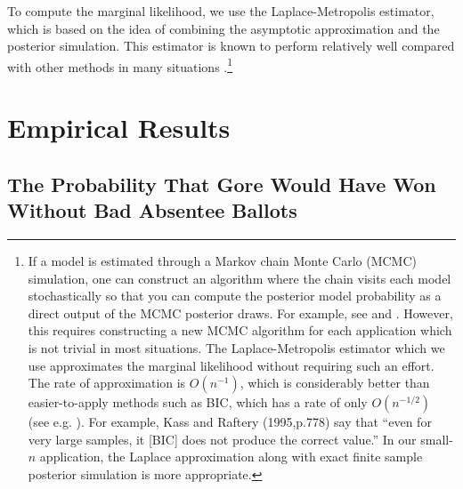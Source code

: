 \documentclass[11pt,titlepage]{article}
\renewcommand{\P}{\text{P}}
\begin{document}
To compute the marginal likelihood, we use the Laplace-Metropolis
estimator, which is based on the idea of combining the asymptotic
approximation and the posterior simulation. This estimator is known to
perform relatively well compared with other methods in many situations
\citep{raft:96,lewi:raft:97,dici:kass:raft:wass:97}.\footnote{If a
  model is estimated through a Markov chain Monte Carlo (MCMC)
  simulation, one can construct an algorithm where the chain visits
  each model stochastically so that you can compute the posterior
  model probability as a direct output of the MCMC posterior draws.
  For example, see \citet{carl:chib:95} and \citet{geor:mccu:93}.
  However, this requires constructing a new MCMC algorithm for each
  application which is not trivial in most situations.  The
  Laplace-Metropolis estimator which we use approximates the marginal
  likelihood without requiring such an effort.  The rate of
  approximation is $O(n^{-1})$, which is considerably better than
  easier-to-apply methods such as BIC, which has a rate of only
  $O(n^{-1/2})$ (see e.g. \citet{kass:tier:kada:89}). For example,
  Kass and Raftery (1995,p.778) say that ``even for very large
  samples, it [BIC] does not produce the correct value.''  In our
  small-$n$ application, the Laplace approximation along with exact
  finite sample posterior simulation is more appropriate.}


\section{Empirical Results}
\label{s:outcome}

\subsection{The Probability That Gore Would Have Won Without Bad 
Absentee Ballots}
\end{document}
